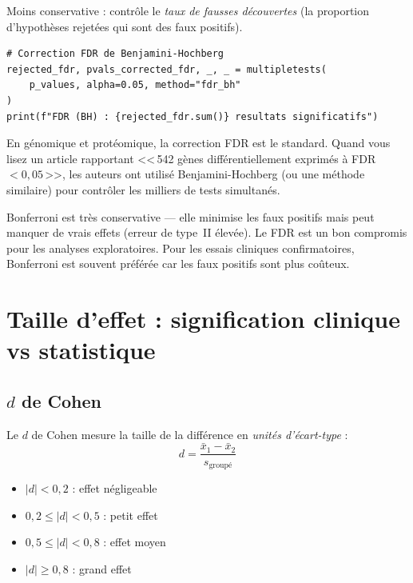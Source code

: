 Moins conservative : contr\^ole le \emph{taux de fausses d\'ecouvertes} (la proportion d'hypoth\`eses rejet\'ees qui sont des faux positifs).

\begin{verbatim}
# Correction FDR de Benjamini-Hochberg
rejected_fdr, pvals_corrected_fdr, _, _ = multipletests(
    p_values, alpha=0.05, method="fdr_bh"
)
print(f"FDR (BH) : {rejected_fdr.sum()} resultats significatifs")
\end{verbatim}

\begin{clinicalnote}
En g\'enomique et prot\'eomique, la correction FDR est le standard. Quand vous lisez un article rapportant <<\,542 g\`enes diff\'erentiellement exprim\'es \`a FDR $< 0{,}05$\,>>, les auteurs ont utilis\'e Benjamini-Hochberg (ou une m\'ethode similaire) pour contr\^oler les milliers de tests simultan\'es.
\end{clinicalnote}

\begin{warningbox}
Bonferroni est tr\`es conservative --- elle minimise les faux positifs mais peut manquer de vrais effets (erreur de type~II \'elev\'ee). Le FDR est un bon compromis pour les analyses exploratoires. Pour les essais cliniques confirmatoires, Bonferroni est souvent pr\'ef\'er\'ee car les faux positifs sont plus co\^uteux.
\end{warningbox}

\section{Taille d'effet : signification clinique vs statistique}

\subsection{$d$ de Cohen}

Le $d$ de Cohen mesure la taille de la diff\'erence en \emph{unit\'es d'\'ecart-type} :
$$d = \frac{\bar{x}_1 - \bar{x}_2}{s_{\text{group\'e}}}$$

\begin{itemize}
  \item $|d| < 0{,}2$ : effet n\'egligeable
  \item $0{,}2 \leq |d| < 0{,}5$ : petit effet
  \item $0{,}5 \leq |d| < 0{,}8$ : effet moyen
  \item $|d| \geq 0{,}8$ : grand effet
\end{itemize}

